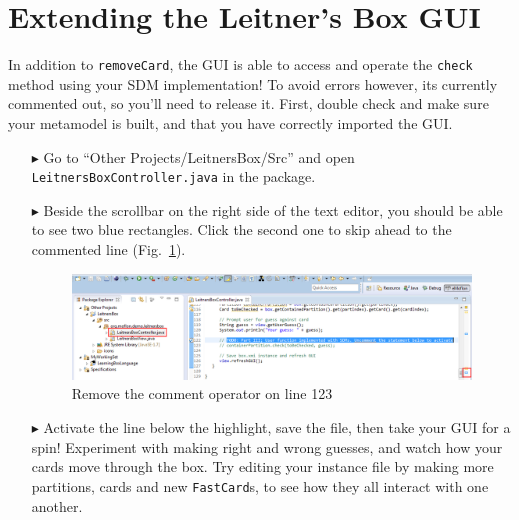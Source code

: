 \newpage
\section{Extending the Leitner's Box GUI}
\genHeader

\vspace{0.5cm}

In addition to \texttt{removeCard}, the GUI is able to access and operate the \texttt{check} method using your SDM implementation! To avoid errors however, its
currently commented out, so you'll need to release it. First, double check and make sure your metamodel is built, and that you have correctly imported the GUI.

\begin{itemize}

\item[$\blacktriangleright$] Go to ``Other Projects/LeitnersBox/Src'' and open \texttt{LeitnersBoxController.java} in the package.

\vspace{0.5cm}

\item[$\blacktriangleright$] Beside the scrollbar on the right side of the text editor, you should be able to see two blue rectangles. Click the second one
to skip ahead to the commented line (Fig.~\ref{fig:remComment}).

\vspace{0.5cm}

\begin{figure}[htp]
\begin{center}
  \includegraphics[width=\textwidth]{eclipse_GUICommentLine}
  \caption{Remove the comment operator on line 123}
  \label{fig:remComment}
\end{center}
\end{figure}

\vspace{0.5cm}

\item[$\blacktriangleright$] Activate the line below the highlight, save the file, then take your GUI for a spin! Experiment with
making right and wrong guesses, and watch how your cards move through the box. Try editing your instance file by making more partitions, cards and
new \texttt{FastCard}s, to see how they all interact with one another.

\end{itemize}
